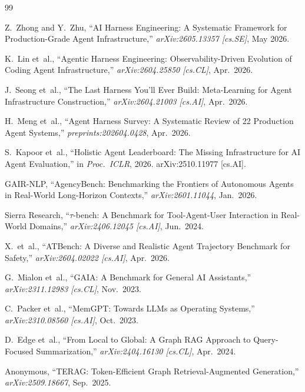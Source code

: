 \documentclass[conference]{IEEEtran}
\begin{document}
\balance

\begin{thebibliography}{99}

Z.~Zhong and Y.~Zhu,
``AI Harness Engineering: A Systematic Framework for Production-Grade
  Agent Infrastructure,''
\emph{arXiv:2605.13357 [cs.SE]}, May 2026.

K.~Lin et~al.,
``Agentic Harness Engineering: Observability-Driven Evolution of
  Coding Agent Infrastructure,''
\emph{arXiv:2604.25850 [cs.CL]}, Apr.\ 2026.

J.~Seong et~al.,
``The Last Harness You'll Ever Build: Meta-Learning for Agent
  Infrastructure Construction,''
\emph{arXiv:2604.21003 [cs.AI]}, Apr.\ 2026.

H.~Meng et~al.,
``Agent Harness Survey: A Systematic Review of 22 Production Agent
  Systems,''
\emph{preprints:202604.0428}, Apr.\ 2026.

S.~Kapoor et~al.,
``Holistic Agent Leaderboard: The Missing Infrastructure for AI Agent
  Evaluation,''
in \emph{Proc.\ ICLR}, 2026. arXiv:2510.11977 [cs.AI].

GAIR-NLP,
``AgencyBench: Benchmarking the Frontiers of Autonomous Agents in
  Real-World Long-Horizon Contexts,''
\emph{arXiv:2601.11044}, Jan.\ 2026.

Sierra Research,
``$\tau$-bench: A Benchmark for Tool-Agent-User Interaction in
  Real-World Domains,''
\emph{arXiv:2406.12045 [cs.AI]}, Jun.\ 2024.

X.~et~al.,
``ATBench: A Diverse and Realistic Agent Trajectory Benchmark for
  Safety,''
\emph{arXiv:2604.02022 [cs.AI]}, Apr.\ 2026.

G.~Mialon et~al.,
``GAIA: A Benchmark for General AI Assistants,''
\emph{arXiv:2311.12983 [cs.CL]}, Nov.\ 2023.

C.~Packer et~al.,
``MemGPT: Towards LLMs as Operating Systems,''
\emph{arXiv:2310.08560 [cs.AI]}, Oct.\ 2023.

D.~Edge et~al.,
``From Local to Global: A Graph RAG Approach to Query-Focused
  Summarization,''
\emph{arXiv:2404.16130 [cs.CL]}, Apr.\ 2024.

Anonymous,
``TERAG: Token-Efficient Graph Retrieval-Augmented Generation,''
\emph{arXiv:2509.18667}, Sep.\ 2025.


\end{thebibliography}
\end{document}
